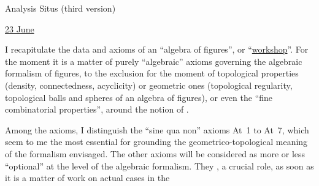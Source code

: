 \begin{center}Analysis Situs (third version)\end{center}

\uline{23 June}

I recapitulate the data and axioms of an ``algebra of figures'', or ``\uline{workshop}''. For the moment it is a matter of purely ``algebraic'' axioms governing the algebraic formalism of figures, to the exclusion for the moment of topological properties (density, connectedness, acyclicity) or  geometric ones (topological regularity, topological balls and spheres of an algebra of figures), or even the ``fine combinatorial properties'', around the notion of .

Among the axioms, I distinguish the ``sine qua non'' axioms At~1 to At~7, which seem to me the most essential for grounding the geometrico-topological meaning of the formalism envisaged. The other axioms will be considered as more or less ``optional'' at the level of the algebraic formalism. They  ,  a crucial role, as soon as it is a matter of work on actual cases in the
